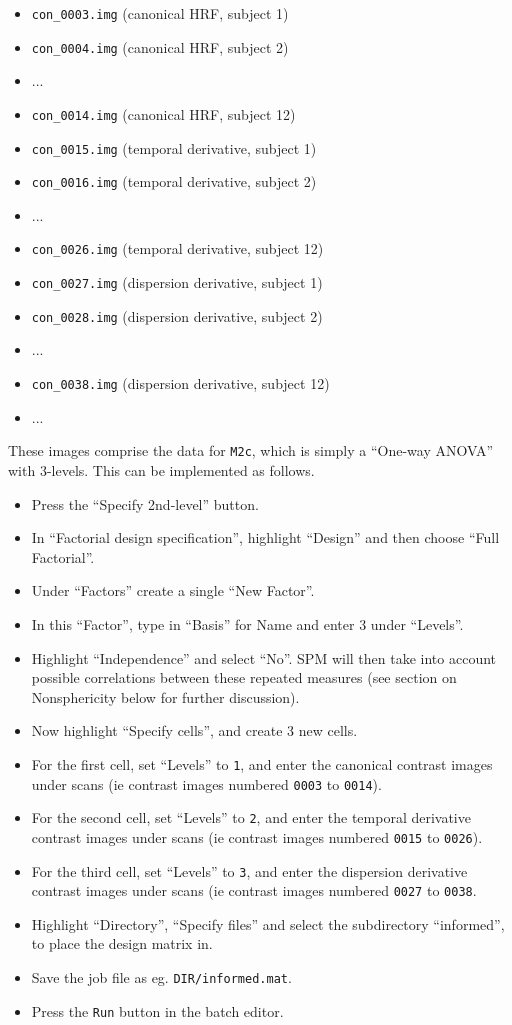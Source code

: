 \begin{itemize}
\item \texttt{con\_0003.img}       (canonical HRF, subject 1)
\item \texttt{con\_0004.img}       (canonical HRF, subject 2)
\item ...
\item \texttt{con\_0014.img}       (canonical HRF, subject 12)
\item \texttt{con\_0015.img}       (temporal derivative, subject 1)
\item \texttt{con\_0016.img}       (temporal derivative, subject 2)
\item ...
\item \texttt{con\_0026.img}       (temporal derivative, subject 12)
\item \texttt{con\_0027.img}       (dispersion derivative, subject 1)
\item \texttt{con\_0028.img}       (dispersion derivative, subject 2)
\item ...
\item \texttt{con\_0038.img}       (dispersion derivative, subject 12)
\item ...
\end{itemize}
These images comprise the data for \texttt{M2c}, which is simply a ``One-way ANOVA'' with 3-levels. This can be implemented as follows.
\begin{itemize}
\item Press the ``Specify 2nd-level'' button.
\item In ``Factorial design specification'', highlight ``Design'' and then choose ``Full Factorial''.
\item Under ``Factors'' create a single ``New Factor''.
\item In this ``Factor'', type in ``Basis'' for Name and enter 3 under ``Levels''.
\item Highlight ``Independence'' and select ``No''. SPM will then take into account possible correlations between these repeated measures (see section on Nonsphericity below for further discussion).
\item Now highlight ``Specify cells'', and create 3 new cells.
\item For the first cell, set ``Levels'' to \texttt{1}, and enter the canonical contrast images under scans (ie contrast images numbered \texttt{0003} to \texttt{0014}).
\item For the second cell, set ``Levels'' to \texttt{2}, and enter the temporal derivative contrast images under scans (ie contrast images numbered \texttt{0015} to \texttt{0026}).
\item For the third cell, set ``Levels'' to \texttt{3}, and enter the dispersion derivative contrast images under scans (ie contrast images numbered \texttt{0027} to \texttt{0038}.
\item Highlight ``Directory'', ``Specify files'' and select the subdirectory ``informed'', to place the design matrix in.
\item Save the job file as eg. \texttt{DIR/informed.mat}.
\item Press the \texttt{Run} button in the batch editor.
\end{itemize}

